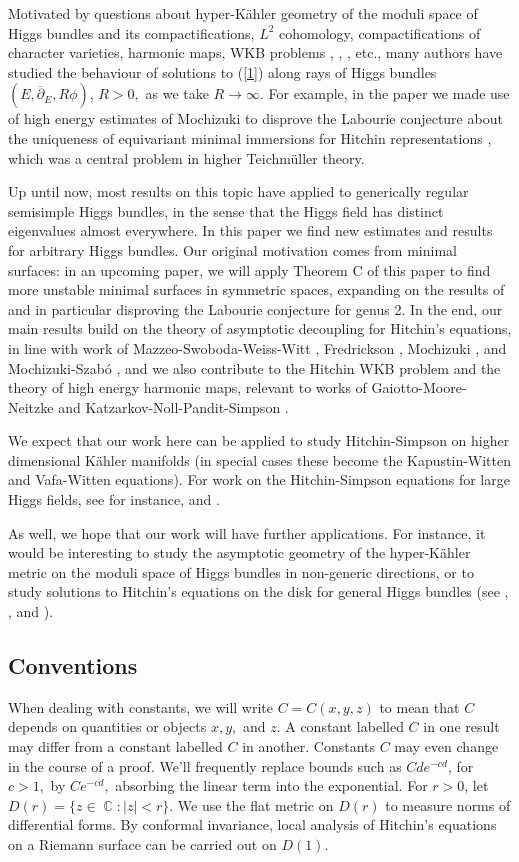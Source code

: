 \documentclass[10pt]{amsart}
\theoremstyle{definition}
\DeclareMathOperator{\C}{\mathbb{C}}
\begin{document}
Motivated by questions about hyper-K{\"a}hler geometry of the moduli space of Higgs bundles and its compactifications, $L^2$ cohomology, compactifications of character varieties, harmonic maps, WKB problems \cite{GMN}, \cite{KNPS}, \cite{MSWW}, etc., many authors have studied the behaviour of solutions to (\ref{1}) along rays of Higgs bundles $(E,\overline{\partial}_E,R\phi)$, $R>0,$ as we take $R\to \infty$. For example, in the paper \cite{SS} we made use of high energy estimates of Mochizuki \cite{Mo} to disprove the Labourie conjecture about the uniqueness of equivariant minimal immersions for Hitchin representations \cite{L1}, which was a central problem in higher Teichm{\"u}ller theory. 

Up until now, most results on this topic have applied to generically regular semisimple Higgs bundles, in the sense that the Higgs field has distinct eigenvalues almost everywhere. In this paper we find new estimates and results for arbitrary Higgs bundles. Our original motivation comes from minimal surfaces: in an upcoming paper, we will apply Theorem C of this paper to find more unstable minimal surfaces in symmetric spaces, expanding on the results of \cite{SS} and in particular disproving the Labourie conjecture for genus 2. In the end, our main results build on the theory of asymptotic decoupling for Hitchin's equations, in line with work of Mazzeo-Swoboda-Weiss-Witt \cite{MSWW}, Fredrickson \cite{Fre}, Mochizuki \cite{Mo}, and Mochizuki-Szab{\'o} \cite{MSz}, and we also contribute to the Hitchin WKB problem and the theory of high energy harmonic maps, relevant to works of Gaiotto-Moore-Neitzke \cite{GMN} and Katzarkov-Noll-Pandit-Simpson \cite{KNPS}. 


We expect that our work here can be applied to study Hitchin-Simpson on higher dimensional K{\"a}hler manifolds (in special cases these become the Kapustin-Witten and Vafa-Witten equations). For work on the Hitchin-Simpson equations for large Higgs fields, see for instance,  \cite{Chen} and \cite{He}.

As well, we hope that our work will have further applications. For instance, it would be interesting to study the asymptotic geometry of the hyper-K{\"a}hler metric on the moduli space of Higgs bundles in non-generic directions, or to study solutions to Hitchin's equations on the disk for general Higgs bundles (see \cite{LMo}, \cite{MSz}, and \cite{Mohyp}). 

\subsection{Conventions}
When dealing with constants, we will write $C=C(x,y,z)$ to  mean that $C$ depends on quantities or objects $x,y,$ and $z$. A constant labelled $C$ in one result may differ from a constant labelled $C$ in another. Constants $C$ may even change in the course of a proof. We'll frequently replace bounds such as $Cde^{-cd}$, for $c>1,$ by $Ce^{-cd},$ absorbing the linear term into the exponential. For $r>0$, let $D(r)=\{z\in \C: |z|<r\}$. We use the flat metric on $D(r)$ to measure norms of differential forms. By conformal invariance, local analysis of Hitchin's equations on a Riemann surface can be carried out on $D(1)$. 
\end{document}
